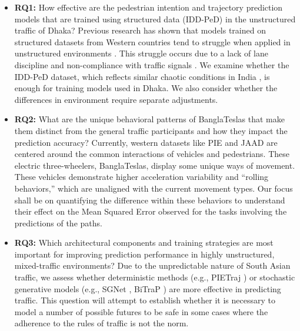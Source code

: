 \documentclass[12pt, a4paper]{article}
\begin{document}
\begin{itemize}


\item \textbf{RQ1:} How effective are the pedestrian intention and trajectory prediction models that are trained using structured data (IDD-PeD) \cite{bokkasam2025pedestrian} in the unstructured traffic of Dhaka? Previous research has shown that models trained on structured datasets from Western countries tend to struggle when applied in unstructured environments \cite{parikh2024idd}. This struggle occurs due to a lack of lane discipline and non-compliance with traffic signals \cite{vasudevan2020pedestrian}. We examine whether the IDD-PeD dataset, which reflects similar chaotic conditions in India \cite{bokkasam2025pedestrian}, is enough for training models used in Dhaka. We also consider whether the differences in environment require separate adjustments.

\item \textbf{RQ2:} What are the unique behavioral patterns of BanglaTeslas that make them distinct from the general traffic participants and how they impact the prediction accuracy? Currently, western datasets like PIE \cite{rasouli2019pie} and JAAD \cite{rasouli2017are} are centered around the common interactions of vehicles and pedestrians. These electric three-wheelers, BanglaTeslas, display some unique ways of movement. These vehicles demonstrate higher acceleration variability and “rolling behaviors,” \cite{vasudevan2020pedestrian} which are unaligned with the current movement types. Our focus shall be on quantifying the difference within these behaviors to understand their effect on the Mean Squared Error observed for the tasks involving the predictions of the paths.

\item \textbf{RQ3:} Which architectural components and training strategies are most important for improving prediction performance in highly unstructured, mixed-traffic environments? Due to the unpredictable nature of South Asian traffic, we assess whether deterministic methods (e.g., PIETraj \cite{rasouli2019pie}) or stochastic generative models (e.g., SGNet \cite{wang2022stepwise}, BiTraP \cite{yao2021bitrap}) are more effective in predicting traffic. This question will attempt to establish whether it is necessary to model a number of possible futures to be safe in some cases where the adherence to the rules of traffic is not the norm.


\end{itemize}
\end{document}
